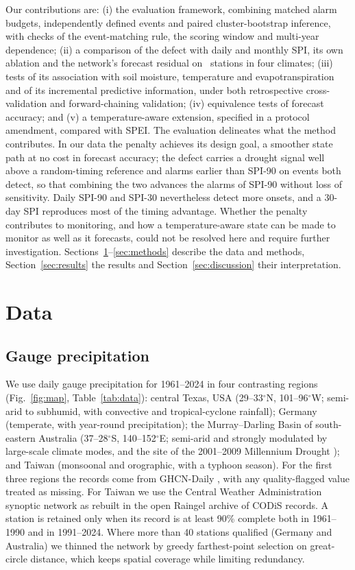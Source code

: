 \documentclass[pdflatex,sn-mathphys-ay]{sn-jnl}
\theoremstyle{thmstyletwo}
\begin{document}
Our contributions are: (i) the evaluation framework, combining matched alarm budgets, independently
defined events and paired cluster-bootstrap inference, with checks of the event-matching rule, the
scoring window and multi-year dependence; (ii) a comparison of the defect with daily and monthly SPI, its
own ablation and the network's forecast residual on \nstall\ stations in four climates; (iii) tests of
its association with soil moisture, temperature and evapotranspiration and of its incremental predictive
information, under both retrospective cross-validation and forward-chaining validation; (iv) equivalence
tests of forecast accuracy; and (v) a temperature-aware extension, specified in a protocol amendment,
compared with SPEI. The evaluation delineates what the method contributes. In our data the penalty
achieves its design goal, a smoother state path at no cost in forecast accuracy; the defect carries a
drought signal well above a random-timing reference and alarms earlier than SPI-90 on events both detect,
so that combining the two advances the alarms of SPI-90 without loss of sensitivity. Daily SPI-90 and
SPI-30 nevertheless detect more onsets, and a 30-day SPI reproduces most of the timing advantage. Whether
the penalty contributes to monitoring, and how a temperature-aware state can be made to monitor as well
as it forecasts, could not be resolved here and require further investigation. Sections~\ref{sec:data}--\ref{sec:methods} describe the data and methods,
Section~\ref{sec:results} the results and Section~\ref{sec:discussion} their interpretation.

\section{Data}\label{sec:data}
\subsection{Gauge precipitation}
We use daily gauge precipitation for 1961--2024 in four contrasting regions
(Fig.~\ref{fig:map}, Table~\ref{tab:data}): central Texas, USA (29--33$^\circ$N, 101--96$^\circ$W;
semi-arid to subhumid, with convective and tropical-cyclone rainfall); Germany (temperate, with
year-round precipitation); the Murray--Darling Basin of south-eastern Australia (37--28$^\circ$S,
140--152$^\circ$E; semi-arid and strongly modulated by large-scale climate modes, and the site of the
2001--2009 Millennium Drought \citep{vandijk2013}); and Taiwan
(monsoonal and orographic, with a typhoon season). For the first three regions the records come from
GHCN-Daily \citep{menne2012}, with any quality-flagged value treated as missing. For Taiwan we use the
Central Weather Administration synoptic network as rebuilt in the open Raingel archive of CODiS
records. A station is retained only when its record is at least 90\% complete both in 1961--1990 and
in 1991--2024. Where more than 40 stations qualified (Germany and Australia) we thinned the network by
greedy farthest-point selection on great-circle distance, which keeps spatial coverage while limiting
redundancy.
\end{document}
